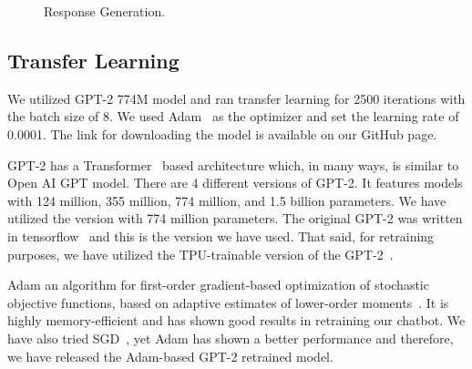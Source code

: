 \documentclass[sigconf,natbib=false]{acmart}
\begin{document}
\begin{figure}[H]
  \centering
  \caption{Response Generation.}
\end{figure}

\subsection{Transfer Learning}

We utilized GPT-2 774M model and ran transfer learning for 2500 iterations with
the batch size of 8. We used Adam~\cite{adam} as the optimizer and set the
learning rate of 0.0001. The link for downloading the model is available on our
GitHub page.

\bigskip

\noindent GPT-2 has a Transformer~\cite{vaswani} based architecture which, in
many ways, is similar to Open AI GPT model\cite{radford2019language}\cite{gpt}.
There are 4 different versions of GPT-2. It features models with 124 million,
355 million, 774 million, and 1.5 billion parameters. We have utilized the
version with 774 million parameters. The original GPT-2 was written in
tensorflow~\cite{tensorflow2015-whitepaper} and this is the version we have
used. That said, for retraining purposes, we have utilized the TPU-trainable
version of the GPT-2~\cite{gpt-2-tpu}.

\bigskip

\noindent Adam an algorithm for first-order gradient-based optimization of
stochastic objective functions, based on adaptive estimates of lower-order
moments~\cite{adam}. It is highly memory-efficient and has shown good results
in retraining our chatbot. We have also tried SGD~\cite{SGD}, yet Adam has
shown a better performance and therefore, we have released the Adam-based
GPT-2 retrained model.
\end{document}
